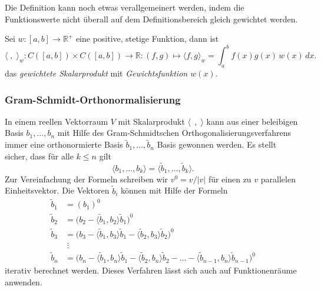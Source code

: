 Die Definition kann noch etwas verallgemeinert werden, indem 
die Funktionswerte nicht überall auf dem Definitionsbereich 
gleich gewichtet werden. 

\begin{definition}
Sei $w\colon [a,b]\to \mathbb{R}^+$ eine positive, stetige Funktion,
dann ist
\[
\langle\;,\;\rangle_w
\colon
C([a,b]) \times C([a,b]) \to \mathbb{R}
:
(f,g) \mapsto \langle f,g\rangle_w = \int_a^b f(x)g(x)\,w(x)\,dx.
\]
das {\em gewichtete Skalarprodukt} mit {\em Gewichtsfunktion $w(x)$}.
\end{definition}

\subsubsection{Gram-Schmidt-Orthonormalisierung}
In einem reellen Vektorraum $V$ mit Skalarprodukt $\langle\;\,,\;\rangle$
kann aus einer beleibigen Basis $b_1,\dots,b_n$ mit Hilfe des 
Gram-Schmidtschen Orthogonalisierungsverfahrens immer eine
orthonormierte Basis $\tilde{b}_1,\dots,\tilde{b}_n$ Basis
gewonnen werden.
Es stellt sicher, dass für alle $k\le n$ gilt
\[
\langle b_1,\dots,b_k\rangle
=
\langle \tilde{b}_1,\dots,\tilde{b}_k\rangle.
\]
Zur Vereinfachung der Formeln schreiben wir $v^0=v/|v|$ für einen zu
$v$ parallelen Einheitsvektor.
Die Vektoren $\tilde{b}_i$ können mit Hilfe der Formeln
\begin{align*}
\tilde{b}_1
&=
(b_1)^0
\\
\tilde{b}_2
&=
\bigl(
b_2
-
\langle \tilde{b}_1,b_2\rangle \tilde{b}_1
\bigr)^0
\\
\tilde{b}_3
&=
\bigl(
b_3
-
\langle \tilde{b}_1,b_3\rangle \tilde{b}_1
-
\langle \tilde{b}_2,b_3\rangle \tilde{b}_2
\bigr)^0
\\
&\;\vdots
\\
\tilde{b}_n
&=
\bigl(
b_n
-
\langle \tilde{b}_1,b_n\rangle \tilde{b}_1
-
\langle \tilde{b}_2,b_n\rangle \tilde{b}_2
-\dots
-
\langle \tilde{b}_{n-1},b_n\rangle \tilde{b}_{n-1}
\bigr)^0
\end{align*}
iterativ berechnet werden.
Dieses Verfahren lässt sich auch auf Funktionenräume anwenden.

